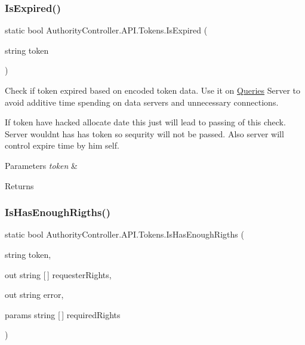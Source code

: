 \subsubsection{\texorpdfstring{Is\+Expired()}{IsExpired()}}
{\footnotesize\ttfamily static bool Authority\+Controller.\+A\+P\+I.\+Tokens.\+Is\+Expired (\begin{DoxyParamCaption}\item[{string}]{token }\end{DoxyParamCaption})\hspace{0.3cm}{\ttfamily [static]}}



Check if token expired based on encoded token data. Use it on \mbox{\hyperlink{namespace_authority_controller_1_1_queries}{Queries}} Server to avoid additive time spending on data servers and unnecessary connections. 

If token have hacked allocate date this just will lead to passing of this check. Server wouldn\textquotesingle{}t has has token so sequrity will not be passed. Also server will control expire time by him self. 


\begin{DoxyParams}{Parameters}
{\em token} & \\
\hline
\end{DoxyParams}
\begin{DoxyReturn}{Returns}

\end{DoxyReturn}
\mbox{\label{class_authority_controller_1_1_a_p_i_1_1_tokens_a3077a786044bdd530ad50dbd615f8beb}} 
\subsubsection{\texorpdfstring{Is\+Has\+Enough\+Rigths()}{IsHasEnoughRigths()}\hspace{0.1cm}{\footnotesize\ttfamily [1/2]}}
{\footnotesize\ttfamily static bool Authority\+Controller.\+A\+P\+I.\+Tokens.\+Is\+Has\+Enough\+Rigths (\begin{DoxyParamCaption}\item[{string}]{token,  }\item[{out string \mbox{[}$\,$\mbox{]}}]{requester\+Rights,  }\item[{out string}]{error,  }\item[{params string \mbox{[}$\,$\mbox{]}}]{required\+Rights }\end{DoxyParamCaption})\hspace{0.3cm}{\ttfamily [static]}}



